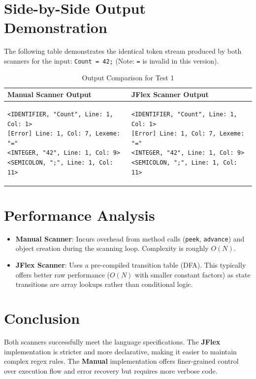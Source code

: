 \documentclass[12pt]{article}
\begin{document}
\section{Side-by-Side Output Demonstration}

The following table demonstrates the identical token stream produced by both scanners for the input: \texttt{Count = 42;} (Note: \texttt{=} is invalid in this version).

\begin{table}[H]
    \centering
    \begin{tabular}{|p{7cm}|p{7cm}|}
        \hline
        \textbf{Manual Scanner Output} & \textbf{JFlex Scanner Output} \\
        \hline
        \begin{verbatim}
<IDENTIFIER, "Count", Line: 1, Col: 1>
[Error] Line: 1, Col: 7, Lexeme: "="
<INTEGER, "42", Line: 1, Col: 9>
<SEMICOLON, ";", Line: 1, Col: 11>
        \end{verbatim} 
        & 
        \begin{verbatim}
<IDENTIFIER, "Count", Line: 1, Col: 1>
[Error] Line: 1, Col: 7, Lexeme: "="
<INTEGER, "42", Line: 1, Col: 9>
<SEMICOLON, ";", Line: 1, Col: 11>
        \end{verbatim} \\
        \hline
    \end{tabular}
    \caption{Output Comparison for Test 1}
\end{table}

\section{Performance Analysis}
\begin{itemize}
    \item \textbf{Manual Scanner}: Incurs overhead from method calls (\texttt{peek}, \texttt{advance}) and object creation during the scanning loop. Complexity is roughly $O(N)$.
    \item \textbf{JFlex Scanner}: Uses a pre-compiled transition table (DFA). This typically offers better raw performance ($O(N)$ with smaller constant factors) as state transitions are array lookups rather than conditional logic.
\end{itemize}

\section{Conclusion}
Both scanners successfully meet the language specifications. The \textbf{JFlex} implementation is stricter and more declarative, making it easier to maintain complex regex rules. The \textbf{Manual} implementation offers finer-grained control over execution flow and error recovery but requires more verbose code.
\end{document}
